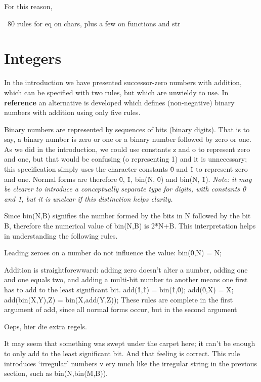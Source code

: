 \documentclass[11pt,twoside]{memoir}
\def\I{\textit} %
\def\B{\textbf}
\begin{document}
For this reason, 

~80 rules for eq on chars, plus a few on functions and str





\section{Integers}

In the introduction we have presented successor-zero numbers with addition, which can be specified with two rules, but which are unwieldy to use. In \B{reference} an alternative is developed which defines (non-negative) binary numbers with addition using only five rules.

Binary numbers are represented by sequences of bits (binary digits). That is to say, a binary number is zero or one or a binary number followed by zero or one. As we did in the introduction, we could use constants z and o to represent zero and one, but that would be confusing (o representing 1) and it is unnecessary; this specification simply uses the character constants \^0 and \^1 to represent zero and one. Normal forms are therefore \^0, \^1, bin(N, \^0) and bin(N, \^1). \I{Note: it may be clearer to introduce a conceptually separate type for digits, with constants \^0 and \^1, but it is unclear if this distinction helps clarity.}

Since bin(N,B) signifies the number formed by the bits in N followed by the bit B, therefore the numerical value of bin(N,B) is 2*N+B. This interpretation helps in understanding the following rules.

Leading zeroes on a number do not influence the value:
	bin(\^0,N) = N;

Addition is straightforewward: adding zero doesn't alter a number, adding one and one equals two, and adding a multi-bit number to another means one first has to add to the least significant bit.
	add(\^1,\^1) = bin(\^1,\^0);
	add(\^0,X) = X;
	add(bin(X,Y),Z) = bin(X,add(Y,Z));
These rules are complete in the first argument of add, since all normal forms occur, but in the second argument 

Oeps, hier die extra regels.

It may seem that something was swept under the carpet here; it can't be enough to only add to the least significant bit. And that feeling is correct. This rule introduces `irregular' numbers v ery much like the irregular string in the previous section, such as bin(N,bin(M,B)).
\end{document}
